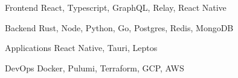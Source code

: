 


\begin{cvskills}


\cvskill
{Frontend} %
{React, Typescript, GraphQL, Relay, React Native} %


\cvskill
{Backend} %
{Rust, Node, Python, Go, Postgres, Redis, MongoDB} %


\cvskill
{Applications} %
{React Native, Tauri, Leptos} %


\cvskill
{DevOps} %
{Docker, Pulumi, Terraform, GCP, AWS} %


\end{cvskills}